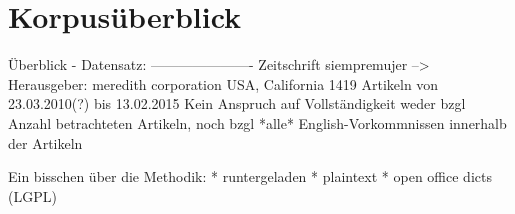\section{Korpusüberblick}

Überblick - Datensatz:
----------------------
Zeitschrift siempremujer --> Herausgeber: meredith corporation USA, California
1419 Artikeln von 23.03.2010(?) bis 13.02.2015
Kein Anspruch auf Vollständigkeit weder bzgl Anzahl betrachteten Artikeln, noch bzgl *alle* English-Vorkommnissen innerhalb der Artikeln

Ein bisschen über die Methodik:
* runtergeladen
* plaintext
* open office dicts (LGPL)
